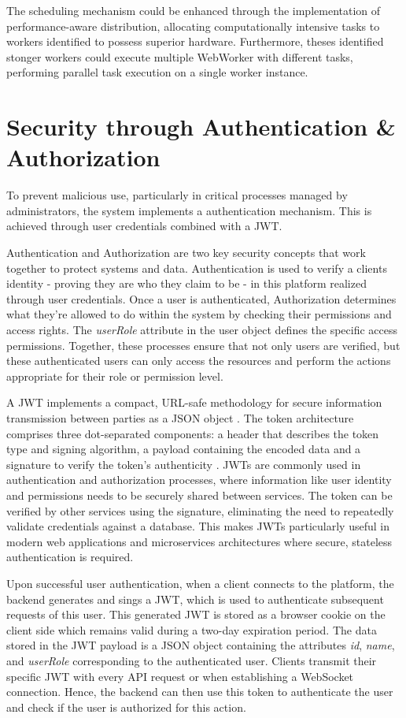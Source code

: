 The scheduling mechanism could be enhanced through the implementation of performance-aware distribution, allocating computationally intensive tasks to workers identified to possess superior hardware. Furthermore, theses identified stonger workers could execute multiple WebWorker with different tasks, performing parallel task execution on a single worker instance.

\section{Security through Authentication \& Authorization}
\label{sec:implementation:authentication}
To prevent malicious use, particularly in critical processes managed by administrators, the system implements a authentication mechanism. This is achieved through user credentials combined with a \ac{JWT}.

Authentication and Authorization are two key security concepts that work together to protect systems and data. Authentication is used to verify a clients identity - proving they are who they claim to be - in this platform realized through user credentials. Once a user is authenticated, Authorization determines what they're allowed to do within the system by checking their permissions and access rights. The \emph{userRole} attribute in the user object defines the specific access permissions. Together, these processes ensure that not only users are verified, but these authenticated users can only access the resources and perform the actions appropriate for their role or permission level.

A \ac{JWT} implements a compact, \acs{URL}-safe methodology for secure information transmission between parties as a \acs{JSON} object \cite{implementation:jwt}. The token architecture comprises three dot-separated components: a header that describes the token type and signing algorithm, a payload containing the encoded data and a signature to verify the token's authenticity \cite{implementation:jwt}. \ac{JWT}s are commonly used in authentication and authorization processes, where information like user identity and permissions needs to be securely shared between services. The token can be verified by other services using the signature, eliminating the need to repeatedly validate credentials against a database. This makes \ac{JWT}s particularly useful in modern web applications and microservices architectures where secure, stateless authentication is required. \cite{implementation:jwt}

Upon successful user authentication, when a client connects to the platform, the backend generates and sings a \ac{JWT}, which is used to authenticate subsequent requests of this user. This generated \ac{JWT} is stored as a browser cookie on the client side which remains valid during a two-day expiration period. The data stored in the \ac{JWT} payload is a \acs{JSON} object containing the attributes \emph{id}, \emph{name}, and \emph{userRole} corresponding to the authenticated user. Clients transmit their specific \ac{JWT} with every \ac{API} request or when establishing a WebSocket connection. Hence, the backend can then use this token to authenticate the user and check if the user is authorized for this action.

